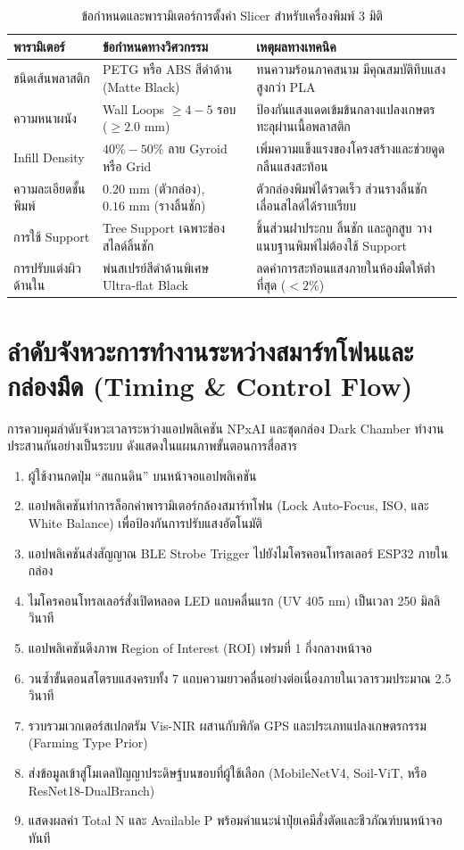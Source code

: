 \documentclass[12pt,a4paper,oneside]{book}
\begin{document}
\begin{table}[ht]
\caption{ข้อกำหนดและพารามิเตอร์การตั้งค่า Slicer สำหรับเครื่องพิมพ์ 3 มิติ}\label{tab:slicing_params}
\centering
\begin{tabularx}{\textwidth}{p{3.5cm}p{4.2cm}Y}
\toprule
\textbf{พารามิเตอร์} & \textbf{ข้อกำหนดทางวิศวกรรม} & \textbf{เหตุผลทางเทคนิค} \\
\midrule
ชนิดเส้นพลาสติก & PETG หรือ ABS สีดำด้าน (Matte Black) & ทนความร้อนภาคสนาม มีคุณสมบัติทึบแสงสูงกว่า PLA \\
ความหนาผนัง & Wall Loops $\ge 4 - 5$ รอบ ($\ge 2.0\text{ mm}$) & ป้องกันแสงแดดเข้มข้นกลางแปลงเกษตรทะลุผ่านเนื้อพลาสติก \\
Infill Density & $40\% - 50\%$ ลาย Gyroid หรือ Grid & เพิ่มความแข็งแรงของโครงสร้างและช่วยดูดกลืนแสงสะท้อน \\
ความละเอียดชั้นพิมพ์ & $0.20\text{ mm}$ (ตัวกล่อง), $0.16\text{ mm}$ (รางลิ้นชัก) & ตัวกล่องพิมพ์ได้รวดเร็ว ส่วนรางลิ้นชักเลื่อนสไลด์ได้ราบเรียบ \\
การใช้ Support & Tree Support เฉพาะช่องสไลด์ลิ้นชัก & ชิ้นส่วนฝาประกบ ลิ้นชัก และลูกสูบ วางแนบฐานพิมพ์ไม่ต้องใช้ Support \\
การปรับแต่งผิวด้านใน & พ่นสเปรย์สีดำด้านพิเศษ Ultra-flat Black & ลดค่าการสะท้อนแสงภายในห้องมืดให้ต่ำที่สุด ($< 2\%$) \\
\bottomrule
\end{tabularx}
\end{table}

\section{ลำดับจังหวะการทำงานระหว่างสมาร์ทโฟนและกล่องมืด (Timing \& Control Flow)}
การควบคุมลำดับจังหวะเวลาระหว่างแอปพลิเคชัน NPxAI และชุดกล่อง Dark Chamber ทำงานประสานกันอย่างเป็นระบบ ดังแสดงในแผนภาพขั้นตอนการสื่อสาร

\begin{enumerate}
    \item ผู้ใช้งานกดปุ่ม ``สแกนดิน'' บนหน้าจอแอปพลิเคชัน
    \item แอปพลิเคชันทำการล็อกค่าพารามิเตอร์กล้องสมาร์ทโฟน (Lock Auto-Focus, ISO, และ White Balance) เพื่อป้องกันการปรับแสงอัตโนมัติ
    \item แอปพลิเคชันส่งสัญญาณ BLE Strobe Trigger ไปยังไมโครคอนโทรลเลอร์ ESP32 ภายในกล่อง
    \item ไมโครคอนโทรลเลอร์สั่งเปิดหลอด LED แถบคลื่นแรก (UV 405 nm) เป็นเวลา 250 มิลลิวินาที
    \item แอปพลิเคชันดึงภาพ Region of Interest (ROI) เฟรมที่ 1 กึ่งกลางหน้าจอ
    \item วนซ้ำขั้นตอนสโตรบแสงครบทั้ง 7 แถบความยาวคลื่นอย่างต่อเนื่องภายในเวลารวมประมาณ 2.5 วินาที
    \item รวบรวมเวกเตอร์สเปกตรัม Vis-NIR ผสานกับพิกัด GPS และประเภทแปลงเกษตรกรรม (Farming Type Prior)
    \item ส่งข้อมูลเข้าสู่โมเดลปัญญาประดิษฐ์บนขอบที่ผู้ใช้เลือก (MobileNetV4, Soil-ViT, หรือ ResNet18-DualBranch)
    \item แสดงผลค่า Total N และ Available P พร้อมคำแนะนำปุ๋ยเคมีสั่งตัดและชีวภัณฑ์บนหน้าจอทันที
\end{enumerate}
\end{document}
